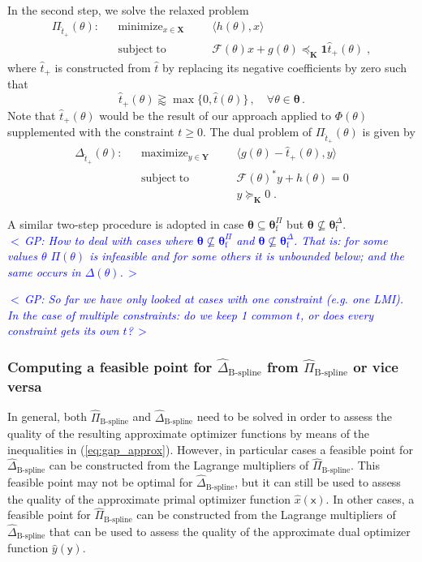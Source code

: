 \documentclass{article}
\DeclareMathOperator*{\minimize}{minimize}
\DeclareMathOperator*{\maximize}{maximize}
\DeclareMathOperator*{\subj}{subject\;to}
\newcommand{\commentGP}[1]{\noindent \textcolor{blue}{\emph{$<\,$GP: #1$\,>$}}}%
\newcommand{\feas}{\mathrm{f}}              %
\newcommand{\ppar}{\theta}                          %
\newcommand{\Ppar}{{\bm{\theta}}}                   %
\newcommand{\X}{\mathbf{X}}                         %
\newcommand{\Y}{\mathbf{Y}}                         %
\newcommand{\K}{\mathbf{K}}                         %
\newcommand{\calF}{\mathcal{F}}                     %
\newcommand{\Pfeas}{\Ppar^\Pi_\feas}                %
\newcommand{\Dfeas}{\Ppar^\Delta_\feas}             %
\newcommand{\cx}{\textsf{x}}        %
\newcommand{\cy}{\textsf{y}}        %
\begin{document}
In the second step, we solve the relaxed problem
\[ \begin{aligned}
\Pi_{\hat{t}_+}(\ppar): && \minimize_{x\in\X} &&& \langle h(\ppar), x \rangle\\%
                        && \subj              &&& \calF(\ppar)x +g(\ppar)\preceq_\K \mathbf{1} \hat{t}_+(\ppar)  \;,%
\end{aligned} \]
where $\hat{t}_+$ is constructed from $\hat{t}$ by replacing its negative coefficients by zero such that
\[ \hat{t}_+(\ppar) \gtrapprox \max\{0, \hat{t}(\ppar)\}\,,\quad\forall\ppar\in\Ppar\,.%
\]
Note that $\hat{t}_+(\ppar)$ would be the result of our approach applied to $\Phi(\ppar)$ supplemented with the constraint $t\geq0$. The dual problem of $\Pi_{\hat{t}_+}(\ppar)$ is given by
\[ \begin{aligned}
\Delta_{\hat{t}_+}(\ppar): && \maximize_{y\in\Y} &&& \langle g(\ppar) - \hat{t}_+(\ppar), y \rangle\\%
               && \subj              &&& \calF(\ppar)^* y + h(\ppar)= 0\\
               &&                    &&& y \succeq_\K 0  \;.
\end{aligned}\]

A similar two-step procedure is adopted in case $\Ppar\subseteq\Pfeas$ but $\Ppar\nsubseteq\Dfeas$.\\

\commentGP{How to deal with cases where $\Ppar\nsubseteq\Pfeas$ and $\Ppar\nsubseteq\Dfeas$. That is: for some values $\ppar$ $\Pi(\ppar)$ is infeasible and for some others it is unbounded below; and the same occurs in $\Delta(\ppar)$.}

\commentGP{So far we have only looked at cases with one constraint (e.g. one LMI). In the case of multiple constraints: do we keep 1 common $t$, or does every constraint gets its own $t$?}


\subsubsection{Computing a feasible point for $\hat{\Delta}_{\text{B-spline}}$ from $\hat{\Pi}_{\text{B-spline}}$ or vice versa}%

In general, both $\hat{\Pi}_{\text{B-spline}}$ and $\hat{\Delta}_{\text{B-spline}}$ need to be solved in order to assess the quality of the resulting approximate optimizer functions by means of the inequalities in (\ref{eq:gap_approx}). However, in particular cases a feasible point for $\hat{\Delta}_{\text{B-spline}}$ can be constructed from the Lagrange multipliers of $\hat{\Pi}_{\text{B-spline}}$. This feasible point may not be optimal for $\hat{\Delta}_{\text{B-spline}}$, but it can still be used to assess the quality of the approximate primal optimizer function $\hat{x}(\cx)$. In other cases, a feasible point for $\hat{\Pi}_{\text{B-spline}}$ can be constructed from the Lagrange multipliers of $\hat{\Delta}_{\text{B-spline}}$ that can be used to assess the quality of the approximate dual optimizer function $\hat{y}(\cy)$.
\end{document}
